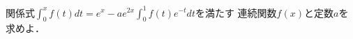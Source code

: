 \documentclass[../../main.tex]{subfiles}
\begin{document}
関係式$\displaystyle\int_0^xf(t)dt=e^x-ae^{2x}\int_0^1f(t)e^{-t}dt$を満たす
連続関数$f(x)$と定数$a$を求めよ．
\end{document}
